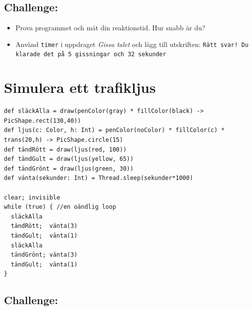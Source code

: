 \section*{\color{BrickRed}Challenge:}


\begin{itemize}

\item {Prova programmet och mät din reaktionstid. Hur snabb är du?}
\item {Använd \lstinline{timer} i uppdraget {\it Gissa talet} och lägg till utskriften: \lstinline{Rätt svar! Du klarade det på 5 gissningar och 32 sekunder}}

\end{itemize}


\chapter{Simulera ett trafikljus}
  

\begin{lstlisting}[basicstyle={\ttfamily\fontsize{14}{17}\selectfont},numbers=none]
def släckAlla = draw(penColor(gray) * fillColor(black) -> PicShape.rect(130,40))
def ljus(c: Color, h: Int) = penColor(noColor) * fillColor(c) * trans(20,h) -> PicShape.circle(15)
def tändRött = draw(ljus(red, 100))
def tändGult = draw(ljus(yellow, 65))
def tändGrönt = draw(ljus(green, 30))
def vänta(sekunder: Int) = Thread.sleep(sekunder*1000)

clear; invisible  
while (true) { //en oändlig loop
  släckAlla
  tändRött;  vänta(3)
  tändGult;  vänta(1) 
  släckAlla
  tändGrönt; vänta(3)
  tändGult;  vänta(1)
}
\end{lstlisting}
        
\section*{\color{BrickRed}Challenge:}



